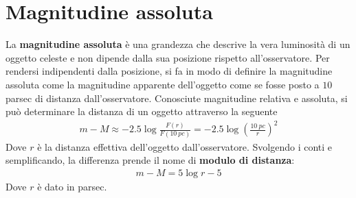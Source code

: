 \documentclass[a4paper, oneside]{book}
\begin{document}
\clearpage
\section{Magnitudine assoluta}
La \textbf{magnitudine assoluta} è una grandezza che descrive la vera luminosità di un oggetto
celeste e non dipende dalla sua posizione rispetto all'osservatore. Per rendersi indipendenti 
dalla posizione, si fa in modo di definire la magnitudine assoluta come la magnitudine apparente dell'oggetto
come se fosse posto a $10$ parsec di distanza dall'osservatore. Conosciute magnitudine relativa e 
assoluta, si può determinare la distanza di un oggetto attraverso la seguente
\begin{align}
    m - M \approx -2.5\log \frac{F(r)}{F(10 \ pc)} =  -2.5 \log \left(\frac{10 \ pc}{r}\right)^{2}
\end{align} 
Dove $r$ è la distanza effettiva dell'oggetto dall'osservatore.
Svolgendo i conti e semplificando, la differenza prende il nome di \textbf{modulo di distanza}:
\begin{align}
    m - M = 5\log r - 5 
\end{align}
Dove $r$ è dato in parsec. 
\end{document}
